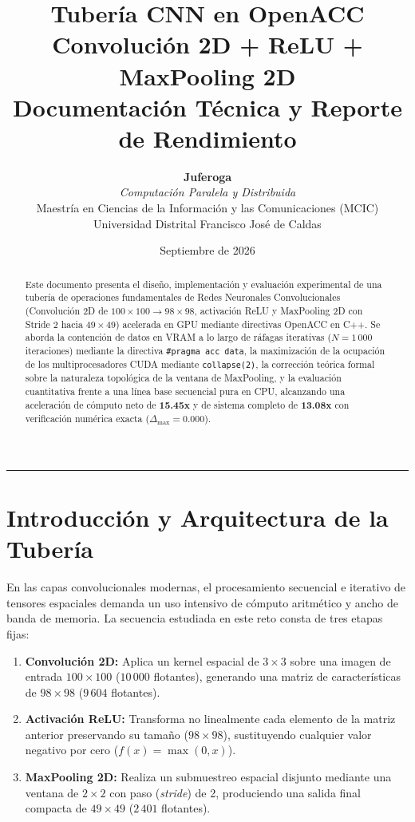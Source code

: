 \documentclass[11pt,letterpaper]{article}
\title{\vspace{-1.0cm}\Huge\bfseries\cambriafont\color{UDSable} Tubería CNN en OpenACC\\[0.3cm]
\Large\color{UDRed} Convolución 2D + ReLU + MaxPooling 2D\\[0.2cm]
\large\color{UDSable}\textmd{Documentación Técnica y Reporte de Rendimiento}}
\author{\textbf{\cambriafont Juferoga} \\
\textit{Computación Paralela y Distribuida} \\
Maestría en Ciencias de la Información y las Comunicaciones (MCIC) \\
Universidad Distrital Francisco José de Caldas}
\date{Septiembre de 2026}
\begin{document}
\maketitle
\thispagestyle{fancy}

\begin{abstract}
\noindent Este documento presenta el diseño, implementación y evaluación experimental de una tubería de operaciones fundamentales de Redes Neuronales Convolucionales (Convolución 2D de $100\times 100 \rightarrow 98\times 98$, activación ReLU y MaxPooling 2D con Stride 2 hacia $49\times 49$) acelerada en GPU mediante directivas OpenACC en C++. Se aborda la contención de datos en VRAM a lo largo de ráfagas iterativas ($N = 1\,000$ iteraciones) mediante la directiva \texttt{\#pragma acc data}, la maximización de la ocupación de los multiprocesadores CUDA mediante \texttt{collapse(2)}, la corrección teórica formal sobre la naturaleza topológica de la ventana de MaxPooling, y la evaluación cuantitativa frente a una línea base secuencial pura en CPU, alcanzando una aceleración de cómputo neto de \textbf{15.45x} y de sistema completo de \textbf{13.08x} con verificación numérica exacta ($\Delta_{\max} = 0.000$).
\end{abstract}

\vspace{0.4cm}
\tableofcontents
\vspace{0.6cm}
\hrule
\vspace{0.6cm}

\section{Introducción y Arquitectura de la Tubería}
En las capas convolucionales modernas, el procesamiento secuencial e iterativo de tensores espaciales demanda un uso intensivo de cómputo aritmético y ancho de banda de memoria. La secuencia estudiada en este reto consta de tres etapas fijas:
\begin{enumerate}
    \item \textbf{Convolución 2D:} Aplica un kernel espacial de $3 \times 3$ sobre una imagen de entrada $100 \times 100$ ($10\,000$ flotantes), generando una matriz de características de $98 \times 98$ ($9\,604$ flotantes).
    \item \textbf{Activación ReLU:} Transforma no linealmente cada elemento de la matriz anterior preservando su tamaño ($98 \times 98$), sustituyendo cualquier valor negativo por cero ($f(x) = \max(0, x)$).
    \item \textbf{MaxPooling 2D:} Realiza un submuestreo espacial disjunto mediante una ventana de $2 \times 2$ con paso (\textit{stride}) de 2, produciendo una salida final compacta de $49 \times 49$ ($2\,401$ flotantes).
\end{enumerate}
\end{document}
